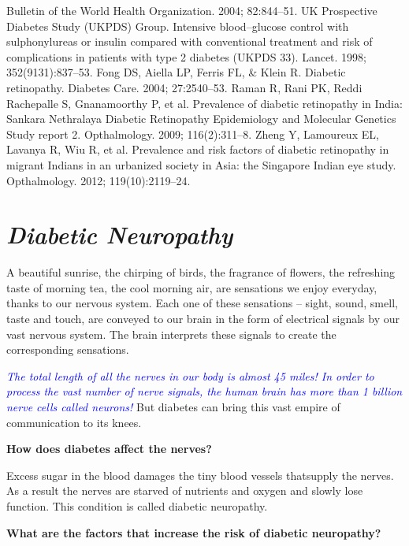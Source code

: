 \begin{thebibliography}{99}
 Bulletin of the World Health Organization. 2004; 82:844–51.
 UK Prospective Diabetes Study (UKPDS) Group. Intensive blood–glucose control with sulphonylureas or insulin compared with conventional treatment and risk of complications in patients with type 2 diabetes (UKPDS 33). Lancet. 1998; 352(9131):837–53.
 Fong DS, Aiella LP, Ferris FL, \& Klein R. Diabetic retinopathy. Diabetes Care. 2004; 27:2540–53.
 Raman R, Rani PK, Reddi Rachepalle S, Gnanamoorthy P, et al. Prevalence of diabetic retinopathy in India: Sankara Nethralaya Diabetic Retinopathy Epidemiology and Molecular Genetics Study report 2. Opthalmology. 2009; 116(2):311–8.
 Zheng Y, Lamoureux EL, Lavanya R, Wiu R, et al. Prevalence and risk factors of diabetic retinopathy in migrant Indians in an urba\-nized society in Asia: the Singapore Indian eye study. Opthalmo\-logy. 2012; 119(10):2119–24.
\end{thebibliography}


\chapter{\textit{Diabetic Neuropathy}}\label{chap16}

A beautiful sunrise, the chirping of birds, the fragrance of flowers, the refreshing taste of morning tea, the cool morning air, are sensations we enjoy everyday, thanks to our nervous system. Each one of these sensations – sight, sound, smell, taste and touch, are conveyed to our brain in the form of electrical signals by our vast nervous system. The brain interprets these signals to create the corresponding sensations.

\textcolor{blue}{\textit{The total length of all the nerves in our body is almost 45 miles! In order to process the vast number of nerve signals, the human brain has more than 1 billion nerve cells called neurons!}} But diabetes can bring this vast empire of communication to its knees.

\noindent\textbf{How does diabetes affect the nerves?}

Excess sugar in the blood damages the tiny blood vessels that\break supply the nerves. As a result the nerves are starved of nutrients and oxygen and slowly lose function. This condition is called diabetic neuropathy.

\noindent\textbf{What are the factors that increase the risk of diabetic neuropathy?}

